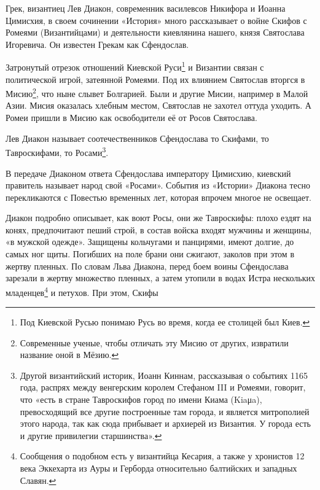 Грек, византиец Лев Диакон, современник василевсов Никифора и Иоанна Цимисхия, в своем сочинении «История» много рассказывает о войне Скифов с Ромеями (Византийцами) и деятельности киевлянина нашего, князя Святослава Игоревича. Он известен Грекам как Сфендослав. 

Затронутый отрезок отношений Киевской Руси\footnote{Под Киевской Русью понимаю Русь во время, когда ее столицей был Киев.} и Византии связан с политической игрой, затеянной Ромеями. Под их влиянием Святослав вторгся в Мисию\footnote{Современные ученые, чтобы отличать эту Мисию от других, извратили название оной в Мёзию.}, что ныне слывет Болгарией. Были и другие Мисии, например в Малой Азии. Мисия оказалась хлебным местом, Святослав не захотел оттуда уходить. А Ромеи пришли в Мисию как освободители её от Росов Святослава.


Лев Диакон называет соотечественников Сфендослава то Скифами, то Тавроскифами, то Росами\footnote{Другой византийский историк, Иоанн Киннам, рассказывая о событиях 1165 года, распрях между венгерским королем Стефаном III и Ромеями, говорит, что «есть в стране Тавроскифов город по имени Киама (Kiaμa), превосходящий все другие построенные там города, и является митрополией этого народа, так как сюда прибывает и архиерей из Византия. У города есть и другие привилегии старшинства».}.

В передаче Диаконом ответа Сфендослава императору Цимисхию, киевский правитель называет народ свой «Росами». События из «Истории» Диакона тесно перекликаются с Повестью временных лет, которая впрочем многое не освещает. 

Диакон подробно описывает, как воют Росы, они же Тавроскифы: плохо ездят на конях, предпочитают пеший строй, в состав войска входят мужчины и женщины, «в мужской одежде». Защищены кольчугами и панцирями, имеют долгие, до самых ног щиты. Погибших на поле брани они сжигают, заколов при этом в жертву пленных. По словам Льва Диакона, перед боем воины Сфендослава зарезали в жертву множество пленных, а затем утопили в водах Истра нескольких младенцев\footnote{Сообщения о подобном есть у византийца Кесария, а также у хронистов 12 века Эккехарта из Ауры и Герборда относительно балтийских и западных Славян.} и петухов. При этом, Скифы\cite{diakon01} 

